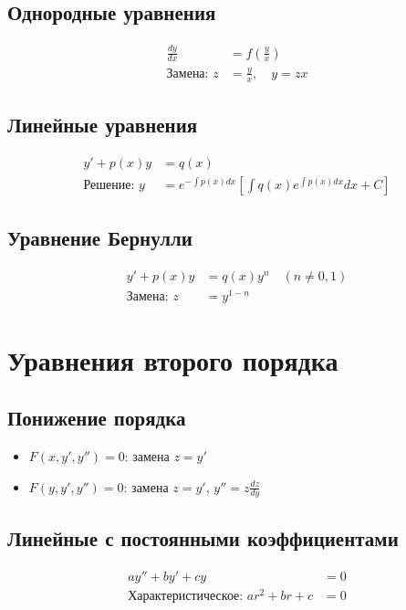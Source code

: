\documentclass[10pt,landscape,a4paper]{article}
\begin{document}
\begin{multicols}{2}
\subsection{Однородные уравнения}
\begin{align}
    \frac{dy}{dx} &= f\left(\frac{y}{x}\right) \\
    \text{Замена: } z &= \frac{y}{x}, \quad y = zx
\end{align}

\subsection{Линейные уравнения}
\begin{align}
    y' + p(x)y &= q(x) \\
    \text{Решение: } y &= e^{-\int p(x)dx}\left[\int q(x)e^{\int p(x)dx}dx + C\right]
\end{align}

\subsection{Уравнение Бернулли}
\begin{align}
    y' + p(x)y &= q(x)y^n \quad (n \neq 0, 1) \\
    \text{Замена: } z &= y^{1-n}
\end{align}

\section{Уравнения второго порядка}

\subsection{Понижение порядка}
\begin{itemize}
    \item $F(x, y', y'') = 0$: замена $z = y'$
    \item $F(y, y', y'') = 0$: замена $z = y'$, $y'' = z\frac{dz}{dy}$
\end{itemize}

\subsection{Линейные с постоянными коэффициентами}
\begin{align}
    ay'' + by' + cy &= 0 \\
    \text{Характеристическое: } ar^2 + br + c &= 0
\end{align}


\end{multicols}
\end{document}
